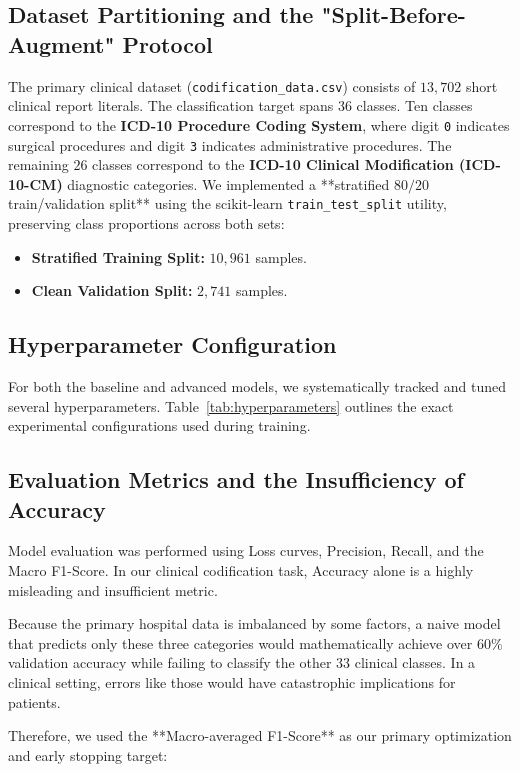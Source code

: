 \documentclass{article}
\begin{document}
\subsection{Dataset Partitioning and the "Split-Before-Augment" Protocol}
The primary clinical dataset (\texttt{codification\_data.csv}) consists of $13,702$ short clinical report literals. The classification target spans $36$ classes. Ten classes correspond to the \textbf{ICD-10 Procedure Coding System}, where digit \texttt{0} indicates surgical procedures and digit \texttt{3} indicates administrative procedures. The remaining $26$ classes  correspond to the \textbf{ICD-10 Clinical Modification (ICD-10-CM)} diagnostic categories.
We implemented a **stratified $80/20$ train/validation split** using the scikit-learn \texttt{train\_test\_split} utility, preserving class proportions across both sets:
\begin{itemize}
    \item \textbf{Stratified Training Split:} $10,961$ samples.
    \item \textbf{Clean Validation Split:} $2,741$ samples.
\end{itemize}


\subsection{Hyperparameter Configuration}
For both the baseline and advanced models, we systematically tracked and tuned several hyperparameters. Table~\ref{tab:hyperparameters} outlines the exact experimental configurations used during training.

\subsection{Evaluation Metrics and the Insufficiency of Accuracy}
Model evaluation was performed using Loss curves, Precision, Recall, and the Macro F1-Score. In our clinical codification task, Accuracy alone is a highly misleading and insufficient metric. 
\vspace{\baselineskip}

Because the primary hospital data is  imbalanced by some factors, a naive model that predicts only these three categories would mathematically achieve over $60\%$ validation accuracy while failing  to classify the other $33$ clinical classes. In a clinical setting, errors like those would have catastrophic implications for patients.

Therefore, we used the **Macro-averaged F1-Score** as our primary optimization and early stopping target:
\end{document}
